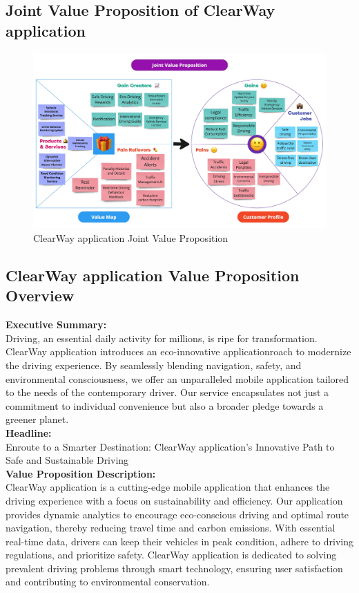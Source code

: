 \documentclass[12pt,a4paper]{article}
\begin{document}
\subsection{Joint Value Proposition of ClearWay application }
\begin{figure}[htbp]
    \centering
    \includegraphics[width=1.0\textwidth]{images/Joint Value Proposition.jpg}
    \caption{ClearWay application Joint Value Proposition}
    \label{fig:example}
\end{figure}

\noindent{}

\subsection{ClearWay application Value Proposition Overview}
\noindent \textbf{Executive Summary:}\\
\noindent Driving, an essential daily activity for millions, is ripe for transformation. ClearWay application introduces an eco-innovative applicationroach to modernize the driving experience. By seamlessly blending navigation, safety, and environmental consciousness, we offer an unparalleled mobile application tailored to the needs of the contemporary driver. Our service encapsulates not just a commitment to individual convenience but also a broader pledge towards a greener planet. \\

\noindent \textbf{Headline:} \\
\noindent Enroute to a Smarter Destination: ClearWay application’s Innovative Path to Safe and Sustainable Driving\\

\noindent \textbf{Value Proposition Description: } \\
\noindent ClearWay application is a cutting-edge mobile application that enhances the driving experience with a focus on sustainability and efficiency. Our application provides dynamic analytics to encourage eco-conscious driving and optimal route navigation, thereby reducing travel time and carbon emissions. With essential real-time data, drivers can keep their vehicles in peak condition, adhere to driving regulations, and prioritize safety. ClearWay application is dedicated to solving prevalent driving problems through smart technology, ensuring user satisfaction and contributing to environmental conservation. \\
\end{document}
